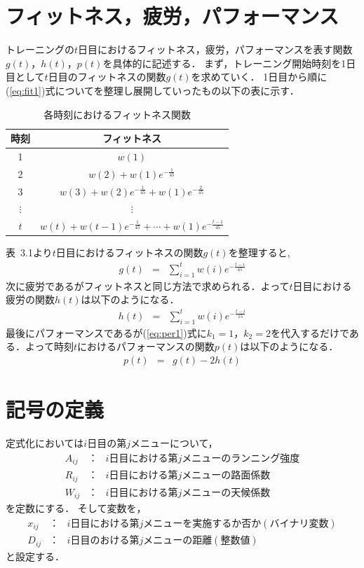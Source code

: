\documentclass[12pt,fleqn]{jreport}
\begin{document}
\section{フィットネス，疲労，パフォーマンス}
トレーニングの$t$日目におけるフィットネス，疲労，パフォーマンスを表す関数$g(t)$，$h(t)$，$p(t)$を具体的に記述する．
まず，トレーニング開始時刻を1日目として$t$日目のフィットネスの関数$g(t)$を求めていく．
1日目から順に(\ref{eq:fit1})式についてを整理し展開していったもの以下の表に示す．
\begin{longtable}{|c|c|}
  \caption{各時刻におけるフィットネス関数}                                 \\
  \hline
  時刻     & フィットネス                                                  \\
  \hline
  1        & $w(1)$                                                        \\
  \hline
  2        & $w(2)+w(1)e^{-\frac{1}{45}}$                                  \\
  \hline
  3        & $w(3)+w(2)e^{-\frac{1}{45}}+w(1)e^{-\frac{2}{45}}$            \\
  \hline
  $\vdots$ & $\vdots$                                                      \\
  \hline
  $t$      & $w(t)+w(t-1)e^{-\frac{1}{45}}+\cdots+w(1)e^{-\frac{t-1}{45}}$ \\
  \hline
\end{longtable}
表\ 3.1より$t$日目におけるフィットネスの関数$g(t)$を整理すると,
\begin{eqnarray}
  g(t)&=&\sum_{i=1}^t w(i)e^{-\frac{t-i}{45}}\label{eq:fit2}%
\end{eqnarray}
次に疲労であるがフィットネスと同じ方法で求められる．よって$t$日目における疲労の関数$h(t)$は以下のようになる．
\begin{eqnarray}
  h(t)&=&\sum_{i=1}^t w(i)e^{-\frac{t-i}{15}}\label{eq:fig2}%
\end{eqnarray}
最後にパフォーマンスであるが(\ref{eq:per1})式に$k_1=1$，$k_2=2$を代入するだけである．よって時刻$t$におけるパフォーマンスの関数$p(t)$は以下のようになる．
\begin{eqnarray}
  p(t)&=&g(t)-2h(t)\label{eq:per2}%
\end{eqnarray}
\section{記号の定義 }
定式化においては$i$日目の第$j$メニューについて，
\begin{eqnarray}
  A_{ij}&：&i日目における第jメニューのランニング強度\nonumber\\
  R_{ij}&：&i日目における第jメニューの路面係数\nonumber\\
  W_{ij}&：&i日目における第jメニューの天候係数\nonumber
\end{eqnarray}
を定数にする．
そして変数を，
\begin{eqnarray}
  x_{ij}&：&i日目における第jメニューを実施するか否か(バイナリ変数)\nonumber\\
  D_{ij}&：&i日目のおける第jメニューの距離(整数値)\nonumber
\end{eqnarray}
と設定する．
\vspace{1cm}
\end{document}
